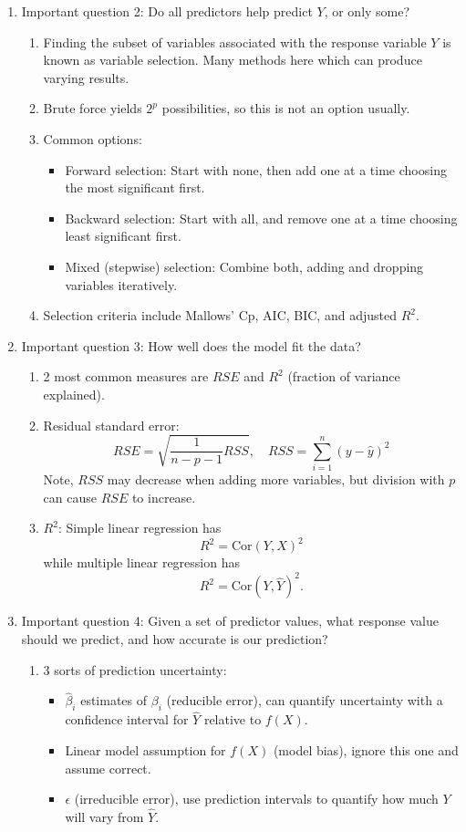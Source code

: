 \documentclass{article}
\begin{document}
\begin{enumerate}
\item Important question 2: Do all predictors help predict $Y$, or only some?
\begin{enumerate}
\item Finding the subset of variables associated with the response variable $Y$ is known as variable selection. Many methods here which can produce varying results.
\item Brute force yields $2^p$ possibilities, so this is not an option usually.
\item Common options:
\begin{itemize}
\item Forward selection: Start with none, then add one at a time choosing the most significant first.
\item Backward selection: Start with all, and remove one at a time choosing least significant first.
\item Mixed (stepwise) selection: Combine both, adding and dropping variables iteratively.
\end{itemize}
\item Selection criteria include Mallows' Cp, AIC, BIC, and adjusted $R^2$. 
\end{enumerate}

\item Important question 3: How well does the model fit the data?
\begin{enumerate}
\item 2 most common measures are $RSE$ and $R^2$ (fraction of variance explained). 
\item Residual standard error:
\[
RSE = \sqrt{\frac{1}{n-p-1}RSS}, \quad RSS=\sum_{i=1}^n (y-\hat{y})^2
\]
Note, $RSS$ may decrease when adding more variables, but division with $p$ can cause $RSE$ to increase.
\item $R^2$: Simple linear regression has
\[
R^2 = \text{Cor}(Y,X)^2
\]
while multiple linear regression has
\[
R^2 = \text{Cor}(Y,\hat{Y})^2.
\]
\end{enumerate}

\item Important question 4: Given a set of predictor values, what response value should we predict, and how accurate is our prediction?
\begin{enumerate}
\item 3 sorts of prediction uncertainty:
\begin{itemize}
\item $\hat{\beta}_i$ estimates of $\beta_i$ (reducible error), can quantify uncertainty with a confidence interval for $\hat{Y}$ relative to $f(X)$.
\item Linear model assumption for $f(X)$ (model bias), ignore this one and assume correct.
\item $\epsilon$ (irreducible error), use prediction intervals to quantify how much $Y$ will vary from $\hat{Y}$.
\end{itemize}
\end{enumerate}
\end{enumerate}
\end{document}
